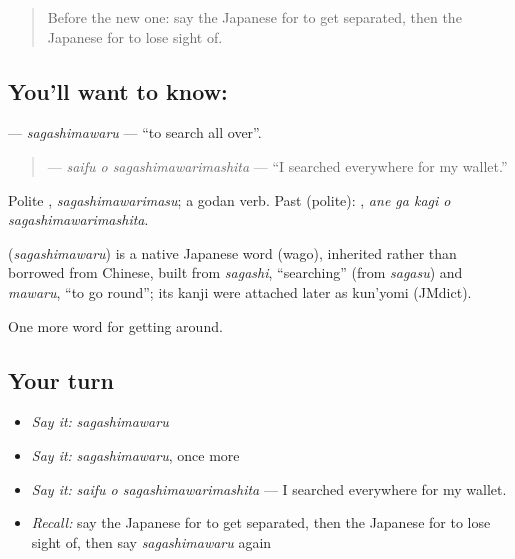 \label{lesson:JA-C424-sagashimawaru}



\begin{quote}
Before the new one: say the Japanese for to get separated, then the Japanese for to lose sight of.
\end{quote}

\subsection*{You'll want to know: }
\textbf{} — \emph{sagashimawaru} — \textquotedblleft{}to search all over\textquotedblright{}.

\begin{quote}
\textbf{ } — \emph{saifu o sagashimawarimashita} — \textquotedblleft{}I searched everywhere for my wallet.\textquotedblright{}
\end{quote}

Polite \textbf{}, \emph{sagashimawarimasu}; a godan verb. Past (polite): \textbf{  }, \emph{ane ga kagi o sagashimawarimashita}.

\begin{cousinweb}
\textbf{} (\emph{sagashimawaru}) is a native Japanese word (wago), inherited rather than borrowed from Chinese, built from \emph{sagashi}, \textquotedblleft{}searching\textquotedblright{} (from \emph{sagasu}) and \emph{mawaru}, \textquotedblleft{}to go round\textquotedblright{}; its kanji were attached later as kun'yomi (JMdict).
\end{cousinweb}

\begin{grammarlens}[title={What you've built}]
One more word for getting around.
\end{grammarlens}

\subsection*{Your turn}
\begin{itemize}
\raggedright
  \item \emph{Say it:} \emph{sagashimawaru}
  \item \emph{Say it:} \emph{sagashimawaru}, once more
  \item \emph{Say it:} \emph{saifu o sagashimawarimashita} — I searched everywhere for my wallet.
  \item \emph{Recall:} say the Japanese for to get separated, then the Japanese for to lose sight of, then say \emph{sagashimawaru} again
\end{itemize}

